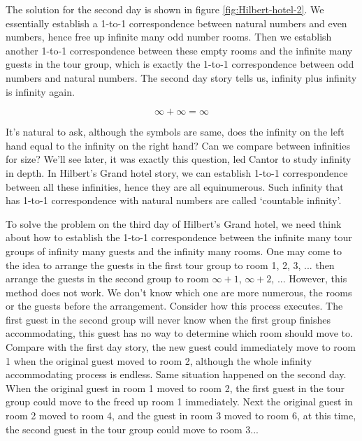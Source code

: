 \documentclass{article}
\begin{document}
The solution for the second day is shown in figure \ref{fig:Hilbert-hotel-2}. We essentially establish a 1-to-1 correspondence between natural numbers and even numbers, hence free up infinite many odd number rooms. Then we establish another 1-to-1 correspondence between these empty rooms and the infinite many guests in the tour group, which is exactly the 1-to-1 correspondence between odd numbers and natural numbers. The second day story tells us, infinity plus infinity is infinity again.

\[
\infty + \infty = \infty
\]

It's natural to ask, although the symbols are same, does the infinity on the left hand equal to the infinity on the right hand? Can we compare between infinities for size? We'll see later, it was exactly this question, led Cantor to study infinity in depth. In Hilbert's Grand hotel story, we can establish 1-to-1 correspondence between all these infinities, hence they are all equinumerous. Such infinity that has 1-to-1 correspondence with natural numbers are called `countable infinity'.

To solve the problem on the third day of Hilbert's Grand hotel, we need think about how to establish the 1-to-1 correspondence between the infinite many tour groups of infinity many guests and the infinity many rooms. One may come to the idea to arrange the guests in the first tour group to room 1, 2, 3, ... then arrange the guests in the second group to room $\infty + 1$, $\infty + 2$, ... However, this method does not work. We don't know which one are more numerous, the rooms or the guests before the arrangement. Consider how this process executes. The first guest in the second group will never know when the first group finishes accommodating, this guest has no way to determine which room should move to. Compare with the first day story, the new guest could immediately move to room 1 when the original guest moved to room 2, although the whole infinity accommodating process is endless. Same situation happened on the second day. When the original guest in room 1 moved to room 2, the first guest in the tour group could move to the freed up room 1 immediately. Next the original guest in room 2 moved to room 4, and the guest in room 3 moved to room 6, at this time, the second guest in the tour group could move to room 3...
\end{document}
